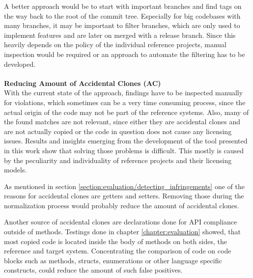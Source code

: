 A better approach would be to start with important branches and find tags on the way back to the root of the commit tree.
Especially for big codebases with many branches, it may be important to filter branches, which are only used to implement features and are later on merged with a release branch.
Since this heavily depends on the policy of the individual reference projects, manual inspection would be required or an approach to automate the filtering has to be developed.\\
\\
\textbf{Reducing Amount of Accidental Clones (AC)}\\
With the current state of the approach, findings have to be inspected manually for violations, which sometimes can be a very time consuming process, since the actual origin of the code may not be part of the reference systems.
Also, many of the found matches are not relevant, since either they are accidental clones and are not actually copied or the code in question does not cause any licensing issues.
Results and insights emerging from the development of the tool presented in this work show that solving those problems is difficult.
This mostly is caused by the peculiarity and individuality of reference projects and their licensing models.

As mentioned in section \ref{section:evaluation/detecting_infringements} one of the reasons for accidental clones are getters and setters.
Removing those during the normalization process would probably reduce the amount of accidental clones.

Another source of accidental clones are declarations done for API compliance outside of methods.
Testings done in chapter \ref{chapter:evaluation} showed, that most copied code is located inside the body of methods on both sides, the reference and target system.
Concentrating the comparison of code on code blocks such as methods, structs, enumerations or other language specific constructs, could reduce the amount of such false positives.

